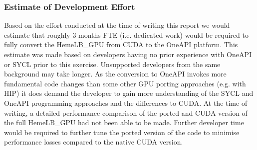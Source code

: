 \documentclass[../main]{subfiles}
\begin{document}
\subsubsection{Estimate of Development Effort}
Based on the effort conducted at the time of writing this report we would estimate that roughly 3 months FTE (i.e. dedicated work) would be required to fully convert the HemeLB\_GPU from CUDA to the OneAPI platform. This estimate was made based on developers having no prior experience with OneAPI or SYCL prior to this exercise. Unsupported developers from the same background may take longer. As the conversion to OneAPI invokes more fundamental code changes than some other GPU porting approaches (e.g. with HIP) it does demand the developer to gain more understanding of the SYCL and OneAPI programming approaches and the differences to CUDA. At the time of writing, a detailed performance comparison of the ported and CUDA version of the full HemeLB\_GPU had not been able to be made. Further developer time would be required to further tune the ported version of the code to minimise performance losses compared to the native CUDA version.
\end{document}

